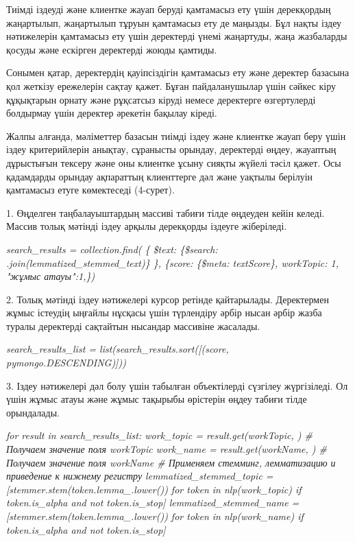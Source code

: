 Тиімді іздеуді және клиентке жауап беруді қамтамасыз ету үшін
дерекқордың жаңартылып, жаңартылып тұруын қамтамасыз ету де маңызды. Бұл
нақты іздеу нәтижелерін қамтамасыз ету үшін деректерді үнемі жаңартуды,
жаңа жазбаларды қосуды және ескірген деректерді жоюды қамтиды.

Сонымен қатар, деректердің қауіпсіздігін қамтамасыз ету және деректер
базасына қол жеткізу ережелерін сақтау қажет. Бұған пайдаланушылар үшін
сәйкес кіру құқықтарын орнату және рұқсатсыз кіруді немесе деректерге
өзгертулерді болдырмау үшін деректер әрекетін бақылау кіреді.

Жалпы алғанда, мәліметтер базасын тиімді іздеу және клиентке жауап беру
үшін іздеу критерийлерін анықтау, сұранысты орындау, деректерді өңдеу,
жауаптың дұрыстығын тексеру және оны клиентке ұсыну сияқты жүйелі тәсіл
қажет. Осы қадамдарды орындау ақпараттың клиенттерге дәл және уақтылы
берілуін қамтамасыз етуге көмектеседі (4-сурет).

1. Өңделген таңбалауыштардың массиві табиғи тілде өңдеуден кейін келеді.
Массив толық мәтінді іздеу арқылы дерекқорды іздеуге жіберіледі.

\emph{search\_results = collection.find( \{
\textquotesingle\$text\textquotesingle:
\{\textquotesingle\$search\textquotesingle: \textquotesingle{}
\textquotesingle.join(lemmatized\_stemmed\_text)\} \},
\{\textquotesingle score\textquotesingle:
\{\textquotesingle\$meta\textquotesingle:
\textquotesingle textScore\textquotesingle\},
\textquotesingle workTopic\textquotesingle: 1, "жұмыс атауы":1,\})}

2. Толық мәтінді іздеу нәтижелері курсор ретінде қайтарылады.
Деректермен жұмыс істеудің ыңғайлы нұсқасы үшін түрлендіру әрбір нысан
әрбір жазба туралы деректерді сақтайтын нысандар массивіне жасалады.

\emph{search\_results\_list =
list(search\_results.sort({[}(\textquotesingle score\textquotesingle,
pymongo.DESCENDING){]}))}

3. Іздеу нәтижелері дәл болу үшін табылған объектілерді сүзгілеу
жүргізіледі. Ол үшін жұмыс атауы және жұмыс тақырыбы өрістерін өңдеу
табиғи тілде орындалады.

\emph{for result in search\_results\_list: work\_topic =
result.get(\textquotesingle workTopic\textquotesingle,
\textquotesingle\textquotesingle) \# Получаем значение поля workTopic
work\_name = result.get(\textquotesingle workName\textquotesingle,
\textquotesingle\textquotesingle) \# Получаем значение поля workName \#
Применяем стемминг, лемматизацию и приведение к нижнему регистру
lemmatized\_stemmed\_topic = {[}stemmer.stem(token.lemma\_.lower()) for
token in nlp(work\_topic) if token.is\_alpha and not token.is\_stop{]}
lemmatized\_stemmed\_name = {[}stemmer.stem(token.lemma\_.lower()) for
token in nlp(work\_name) if token.is\_alpha and not token.is\_stop{]}}

